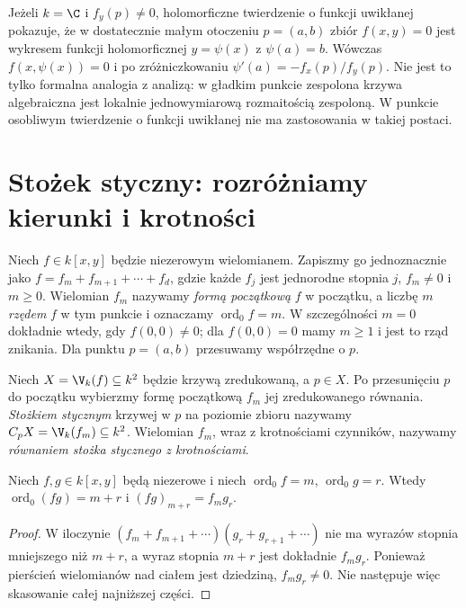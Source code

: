 \begin{uwaga}
Jeżeli $k=\C$ i $f_y(p)\ne0$, holomorficzne twierdzenie
o funkcji uwikłanej pokazuje, że w dostatecznie małym
otoczeniu $p=(a,b)$ zbiór $f(x,y)=0$ jest wykresem
funkcji holomorficznej $y=\psi(x)$ z $\psi(a)=b$.
Wówczas $f(x,\psi(x))=0$ i po zróżniczkowaniu
$\psi'(a)=-f_x(p)/f_y(p)$. Nie jest to tylko formalna
analogia z analizą: w gładkim punkcie zespolona krzywa
algebraiczna jest lokalnie jednowymiarową rozmaitością
zespoloną. W punkcie osobliwym twierdzenie o funkcji
uwikłanej nie ma zastosowania w takiej postaci.
\end{uwaga}

\section{Stożek styczny: rozróżniamy kierunki i krotności}

\begin{definicja}
Niech $f\in k[x,y]$ będzie niezerowym wielomianem.
Zapiszmy go jednoznacznie jako
$f=f_m+f_{m+1}+\cdots+f_d$, gdzie każde $f_j$
jest jednorodne stopnia $j$, $f_m\ne0$ i $m\ge0$.
Wielomian $f_m$ nazywamy \emph{formą początkową} $f$
w początku, a liczbę $m$ \emph{rzędem} $f$
w tym punkcie i oznaczamy $\operatorname{ord}_0f=m$.
W szczególności $m=0$ dokładnie wtedy, gdy $f(0,0)\ne0$;
dla $f(0,0)=0$ mamy $m\ge1$ i jest to rząd znikania.
Dla punktu $p=(a,b)$ przesuwamy współrzędne o $p$.
\end{definicja}

\begin{definicja}
Niech $X=\V_k(f)\subseteq k^2$ będzie krzywą zredukowaną,
a $p\in X$. Po przesunięciu $p$ do początku wybierzmy
formę początkową $f_m$ jej zredukowanego równania.
\emph{Stożkiem stycznym} krzywej w $p$ na poziomie zbioru
nazywamy $C_pX=\V_k(f_m)\subseteq k^2$.
Wielomian $f_m$, wraz z krotnościami czynników,
nazywamy \emph{równaniem stożka stycznego z krotnościami}.
\end{definicja}

\begin{lemat}
Niech $f,g\in k[x,y]$ będą niezerowe i niech
$\operatorname{ord}_0f=m$, $\operatorname{ord}_0g=r$.
Wtedy $\operatorname{ord}_0(fg)=m+r$ i
$(fg)_{m+r}=f_mg_r$.
\end{lemat}
\begin{proof}
W iloczynie $(f_m+f_{m+1}+\cdots)(g_r+g_{r+1}+\cdots)$
nie ma wyrazów stopnia mniejszego niż $m+r$,
a wyraz stopnia $m+r$ jest dokładnie $f_mg_r$.
Ponieważ pierścień wielomianów nad ciałem jest dziedziną,
$f_mg_r\ne0$. Nie następuje więc skasowanie całej
najniższej części.
\end{proof}

